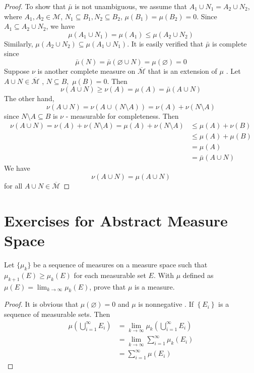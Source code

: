 \documentclass[../main.tex]{subfiles}
\begin{document}
\begin{proof}
    To show that \(  \bar{\mu}  \) is not unambiguous, we assume that \(  A_1\cup N_1= A_2\cup N_2  \), where \(  A_1,A_2\in \mathcal{M}  \), \(  N_1\subseteq B_1,N_2\subseteq B_2  \), \(  \mu \left( B_1 \right)= \mu \left( B_2 \right)= 0    \). Since \(  A_1\subseteq A_2\cup N_2  \), we have \[
    \mu \left( A_1\cup N_1 \right)= \mu \left( A_1 \right)\le \mu \left( A_2\cup N_2 \right)   
    \] Similarly, \(  \mu \left( A_2\cup N_2 \right)\subseteq \mu \left( A_1\cup N_1 \right)    \). 
 It is easily verified that \(  \bar{\mu}  \) is complete since \[
\bar{\mu}\left( N \right)= \bar{\mu}\left( \varnothing\cup N \right)= \mu \left( \varnothing \right)= 0   
 \] Suppose \(  \nu   \) is another complete measure on \(  \overline{\mathcal{M}}  \) that is an extension of \(  \mu   \) . Let \(  A\cup N\in  \overline{\mathcal{M}}  \) , \(  N\subseteq B,  \) \(  \mu \left( B \right)= 0   \). Then \[
 \nu \left( A\cup N \right)\ge  \nu \left( A \right)= \mu \left( A \right)= \bar{\mu}\left( A\cup N \right)    
 \]The other hand, \[
 \nu \left( A\cup N \right)= \nu \left( A\cup \left( N\setminus A \right)  \right)= \nu \left( A \right)+ \nu \left( N\setminus A \right)    
 \] since \(  N\setminus A\subseteq B  \) is \(  \nu   \)  - measurable for completeness. Then \[
\begin{aligned}
 \nu \left( A\cup N \right)= \nu \left( A \right)+ \nu \left( N\setminus A \right)= \mu \left( A \right)+ \nu \left( N\setminus A \right)&\le \mu \left( A \right)+\nu  \left(  B\right)   \\ 
  &\le \mu \left( A \right)+ \mu \left( B \right)\\ 
   &= \mu \left( A \right)\\ 
    &= \bar{\mu}\left( A\cup N \right)      
\end{aligned}   
 \]We have \[
 \nu \left( A\cup N \right)= \mu \left( A\cup N \right)   
 \]for all \(  A\cup N \in   \overline{\mathcal{M}}  \)      
\end{proof}
\section*{Exercises for Abstract Measure Space}
\begin{exercise}{}{}
    Let $\{\mu_k\}$ be a sequence of measures on a measure space such that $\mu_{k+1}(E) \ge \mu_k(E)$ for each measurable set $E$. With $\mu$ defined as $\mu(E) = \lim_{k\to\infty} \mu_k(E)$, prove that $\mu$ is a measure.
\end{exercise}
\begin{proof}
    It is obvious that \(  \mu \left( \varnothing \right)= 0   \) and \(  \mu   \) is nonnegative . If \(  \left\{ E_{i} \right\}  \) is a sequence of measurable sets. Then \[
\begin{aligned}
    \mu \left( \bigcup _{i= 1}^{\infty}E_{i} \right)&= \lim_{k\to \infty}\mu _{k} \left( \bigcup _{i= 1}^{\infty}E_{i} \right) \\ 
     &= \lim_{k\to \infty} \sum _{i= 1}^{\infty}\mu _{k}\left( E_{i} \right)  \\ 
      &= \sum _{i= 1}^{\infty}\mu \left( E_{i} \right) 
\end{aligned}
    \]  
\end{proof}
\end{document}
